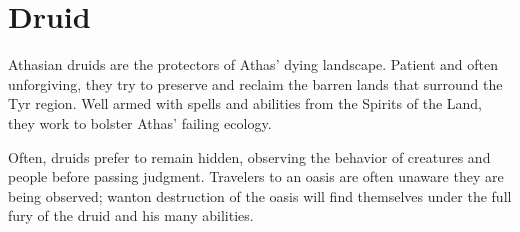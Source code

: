 \section{Druid}

Athasian druids are the protectors of Athas' dying landscape. Patient and often unforgiving, they try to preserve and reclaim the barren lands that surround the Tyr region. Well armed with spells and abilities from the Spirits of the Land, they work to bolster Athas' failing ecology.

Often, druids prefer to remain hidden, observing the behavior of creatures and people before passing judgment. Travelers to an oasis are often unaware they are being observed; wanton destruction of the oasis will find themselves under the full fury of the druid and his many abilities.

